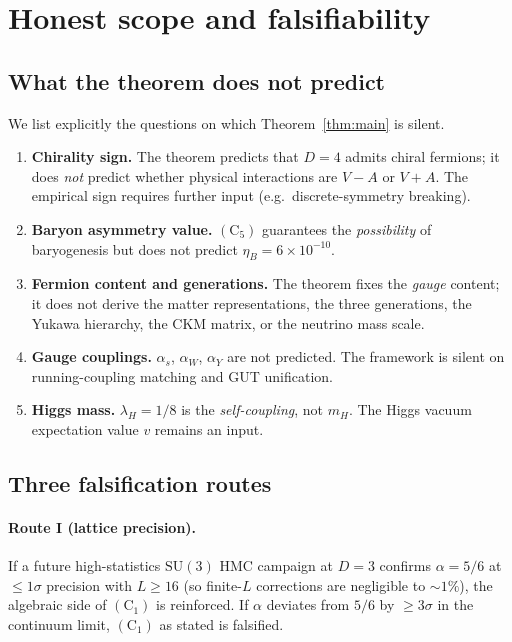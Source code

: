 \documentclass[11pt,reqno]{amsart}
\theoremstyle{plain}
\theoremstyle{definition}
\theoremstyle{remark}
\newcommand{\SU}{\mathrm{SU}}
\newcommand{\Cone}{(\mathrm{C}_1)}
\newcommand{\Cfive}{(\mathrm{C}_5)}
\begin{document}
\section{Honest scope and falsifiability}
\label{sec:scope}

\subsection{What the theorem does not predict}\label{ssec:not-predicted}

We list explicitly the questions on which Theorem~\ref{thm:main} is silent.

\begin{enumerate}[label=(\roman*), leftmargin=*]
  \item \textbf{Chirality sign.} The theorem predicts that $D = 4$ admits chiral fermions; it does \emph{not} predict whether physical interactions are $V{-}A$ or $V{+}A$. The empirical sign requires further input (e.g.\ discrete-symmetry breaking).
  \item \textbf{Baryon asymmetry value.} $\Cfive$ guarantees the \emph{possibility} of baryogenesis but does not predict $\eta_B = 6 \times 10^{-10}$.
  \item \textbf{Fermion content and generations.} The theorem fixes the \emph{gauge} content; it does not derive the matter representations, the three generations, the Yukawa hierarchy, the CKM matrix, or the neutrino mass scale.
  \item \textbf{Gauge couplings.} $\alpha_s$, $\alpha_W$, $\alpha_Y$ are not predicted. The framework is silent on running-coupling matching and GUT unification.
  \item \textbf{Higgs mass.} $\lambda_H = 1/8$ is the \emph{self-coupling}, not $m_H$. The Higgs vacuum expectation value $v$ remains an input.
\end{enumerate}

\subsection{Three falsification routes}\label{ssec:falsification}

\paragraph{Route I (lattice precision).}
If a future high-statistics $\SU(3)$ HMC campaign at $D = 3$ confirms $\alpha = 5/6$ at $\le 1\sigma$ precision with $L \ge 16$ (so finite-$L$ corrections are negligible to $\sim 1\%$), the algebraic side of $\Cone$ is reinforced. If $\alpha$ deviates from $5/6$ by $\ge 3\sigma$ in the continuum limit, $\Cone$ as stated is falsified.
\end{document}
